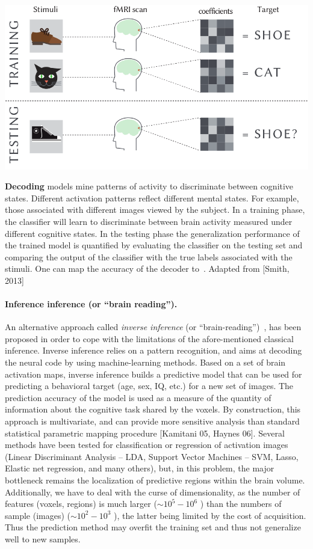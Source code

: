 \begin{pagefigure}
  \includegraphics[width=1\linewidth]{figures/decoding.png}
  \caption{\textbf{Decoding} models mine
patterns of activity to discriminate
between cognitive states. Different
activation patterns reflect different mental states. For example,
those associated with different images viewed by the subject.
In a training phase, the classifier will
learn to discriminate between brain activity measured under different
cognitive states. In the testing phase the generalization performance of the trained model is
quantified by evaluating the classifier on the testing set and comparing
the output of the classifier with the true labels associated with
the stimuli. One can map the accuracy of the decoder to~\citep{dehaene1998}. Adapted from [Smith, 2013]}
\end{pagefigure}

\paragraph{Inference inference (or ``brain reading'').}
An alternative approach called \textit{inverse inference} (or ``brain-reading'')~\citep{dehaene1998,cox2003}, has been proposed in order to cope with the limitations of the afore-mentioned classical inference. Inverse inference relies on a pattern recognition, and aims at decoding the neural code by using machine-learning methods. Based on a set of brain activation maps, inverse inference builds a predictive model that can be used for predicting a behavioral target (age, sex, IQ, etc.) for a new set of images. The prediction accuracy of the model is used as a measure of the quantity of information about the cognitive task shared by the voxels. By construction, this approach is multivariate, and can provide more sensitive analysis than standard statistical parametric mapping procedure [Kamitani 05, Haynes 06]. Several methods have been tested for classification or regression of activation images (Linear Discriminant Analysis -- LDA, Support Vector Machines -- SVM, Lasso, Elastic net regression, and many others), but, in this problem, the major bottleneck remains the localization of predictive regions within the brain volume. Additionally, we have to deal with the curse of dimensionality, as the number of features (voxels, regions) is much larger ($\sim 10^5-10^6$ ) than the numbers of sample (images) ($\sim 10^2 - 10^3$ ), the latter being limited by the cost of acquisition. Thus the prediction method may overfit the training set and thus not generalize well to new samples.

